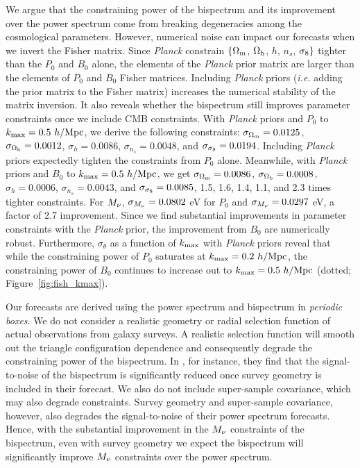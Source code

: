 We argue that the constraining power of the bispectrum and its improvement 
over the power spectrum come from breaking degeneracies among the cosmological 
parameters. However, numerical noise can impact our forecasts when we invert 
the Fisher matrix. Since {\em Planck} constrain $\{\Omega_{\rm m}$, $\Omega_{\rm b}$, $h$, $n_s$, $\sigma_8\}$ 
tighter than the $P_0$ and $B_0$ alone, the elements of the {\em Planck} prior 
matrix are larger than the elements of $P_0$ 
and $B_0$ Fisher matrices. Including {\em Planck} priors (\emph{i.e.} adding the 
prior matrix to the Fisher matrix) increases the numerical stability of the 
matrix inversion. It also reveals whether the bispectrum still improves parameter 
constraints once we include CMB constraints. With {\em Planck} priors and $P_0$ to 
$k_{\rm max} = 0.5~h/{\rm Mpc}$, we derive the following constraints: 
$\sigma_{\Omega_{\rm m}} = 0.0125$, $\sigma_{\Omega_{\rm b}} = 0.0012$, $\sigma_h=0.0086$, 
$\sigma_{n_s}=0.0048$, and $\sigma_{\sigma_8}=0.0194$. 
Including {\em Planck} priors expectedly tighten the constraints from $P_0$ alone. 
Meanwhile, with {\em Planck} priors and $B_0$ to $k_{\rm max} = 0.5~h/{\rm Mpc}$, we get 
$\sigma_{\Omega_{\rm m}} = 0.0086$, $\sigma_{\Omega_{\rm b}} = 0.0008$, $\sigma_h=0.0006$, 
$\sigma_{n_s}=0.0043$, and $\sigma_{\sigma_8}=0.0085$, 1.5, 1.6, 1.4, 1.1, and 2.3 
times tighter constraints. For $M_\nu$, $\sigma_{M_\nu} = 0.0802$ eV for $P_0$ 
and $\sigma_{M_\nu} = 0.0297$ eV, a factor of 2.7 improvement. Since we find
substantial improvements in parameter constraints with the {\em Planck} prior, 
the improvement from $B_0$ are numerically robust. Furthermore, $\sigma_\theta$ 
as a function of $k_{\rm max}$ with {\em Planck} priors reveal that while the 
constraining power of $P_0$ saturates at $k_{\rm max} = 0.2~h/{\rm Mpc}$, the constraining 
power of $B_0$ continues to increase out to $k_{\rm max} = 0.5~h/{\rm Mpc}$ 
(dotted; Figure~\ref{fig:fish_kmax}). 

Our forecasts are derived using the power spectrum and bispectrum in
\emph{periodic boxes}. We do not consider a realistic geometry or radial selection 
function of actual observations from galaxy 
surveys. A realistic selection function will smooth out the triangle 
configuration dependence and consequently degrade the constraining power 
of the bispectrum. In \cite{sefusatti2005}, for instance, they find that the 
signal-to-noise of the bispectrum is significantly reduced once survey geometry 
is included in their forecast. We also do not include super-sample covariance, 
which may also degrade constraints. Survey geometry and super-sample covariance, 
however, also degrades the signal-to-noise of their power spectrum forecasts. 
Hence, with the substantial improvement in the $M_\nu$ constraints of the bispectrum, 
even with survey geometry we expect the bispectrum will significantly improve 
$M_\nu$ constraints over the power spectrum.  

